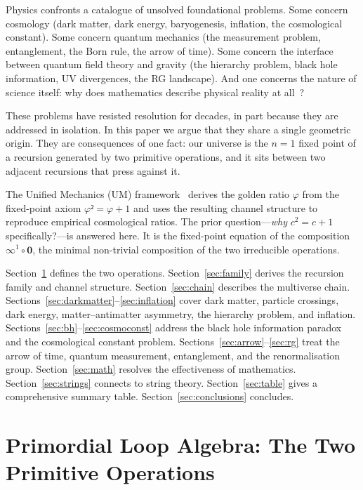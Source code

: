 \documentclass[prd,twocolumn,preprintnumbers,amsmath,amssymb]{revtex4-2}
\newcommand{\acc}{\mathbf{\infty}}
\newcommand{\inv}{\mathbf{0}}
\begin{document}
Physics confronts a catalogue of unsolved foundational problems.  Some
concern cosmology (dark matter, dark energy, baryogenesis, inflation,
the cosmological constant).  Some concern quantum mechanics (the
measurement problem, entanglement, the Born rule, the arrow of time).
Some concern the interface between quantum field theory and gravity
(the hierarchy problem, black hole information, UV divergences, the
RG landscape).  And one concerns the nature of science itself: why
does mathematics describe physical reality at all~\cite{Wigner1960}?

These problems have resisted resolution for decades, in part because
they are addressed in isolation.  In this paper we argue that they
share a single geometric origin.  They are consequences of one fact:
our universe is the $n=1$ fixed point of a recursion generated by two
primitive operations, and it sits between two adjacent recursions
that press against it.

The Unified Mechanics (UM) framework~\cite{Shields2026a,Shields2026b}
derives the golden ratio $\varphi$ from the fixed-point axiom
$φ² = φ + 1$ and uses the resulting channel structure to reproduce
empirical cosmological ratios.  The prior question---\emph{why}
$c^2 = c+1$ specifically?---is answered here.  It is the fixed-point
equation of the composition $\acc^1 \circ \inv$, the minimal
non-trivial composition of the two irreducible operations.

Section~\ref{sec:primitives} defines the two operations.
Section~\ref{sec:family} derives the recursion family and channel structure.
Section~\ref{sec:chain} describes the multiverse chain.
Sections~\ref{sec:darkmatter}--\ref{sec:inflation} cover dark matter,
particle crossings, dark energy, matter--antimatter asymmetry, the
hierarchy problem, and inflation.
Sections~\ref{sec:bh}--\ref{sec:cosmoconst} address the black hole
information paradox and the cosmological constant problem.
Sections~\ref{sec:arrow}--\ref{sec:rg} treat the arrow of time,
quantum measurement, entanglement, and the renormalisation group.
Section~\ref{sec:math} resolves the effectiveness of mathematics.
Section~\ref{sec:strings} connects to string theory.
Section~\ref{sec:table} gives a comprehensive summary table.
Section~\ref{sec:conclusions} concludes.

\section{Primordial Loop Algebra: The Two Primitive Operations}
\label{sec:primitives}
\end{document}
